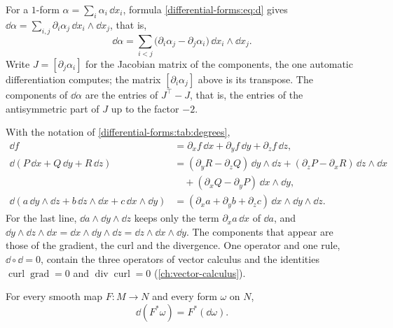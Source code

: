 \begin{notechapter}
For a $1$-form $\alpha = \sum_i\alpha_i\,\dd x_i$, formula
\eqref{differential-forms:eq:d} gives
$\dd\alpha = \sum_{i,j}\partial_i\alpha_j\,\dd x_i\wedge\dd x_j$, that is,
\begin{equation}\label{differential-forms:eq:one-form}
  \dd\alpha = \sum_{i<j}\bigl(\partial_i\alpha_j - \partial_j\alpha_i
  \bigr)\,\dd x_i\wedge\dd x_j .
\end{equation}
Write $J = [\partial_j\alpha_i]$ for the Jacobian matrix of the
components, the one automatic differentiation computes; the matrix
$[\partial_i\alpha_j]$ above is its transpose. The components of
$\dd\alpha$ are the entries of $J^\top - J$, that is, the entries of
the antisymmetric part of $J$ up to the factor $-2$.

\begin{example}[Forms on $\R^3$]\label{differential-forms:ex:r3}
With the notation of \cref{differential-forms:tab:degrees},
\begin{align*}
  \dd f &= \partial_xf\,\dd x + \partial_yf\,\dd y
          + \partial_zf\,\dd z , \\
  \dd(P\,\dd x + Q\,\dd y + R\,\dd z)
  &= (\partial_yR - \partial_zQ)\,\dd y\wedge\dd z
   + (\partial_zP - \partial_xR)\,\dd z\wedge\dd x \\
  &\quad + (\partial_xQ - \partial_yP)\,\dd x\wedge\dd y , \\
  \dd(a\,\dd y\wedge\dd z + b\,\dd z\wedge\dd x
      + c\,\dd x\wedge\dd y)
  &= (\partial_xa + \partial_yb + \partial_zc)\,
     \dd x\wedge\dd y\wedge\dd z .
\end{align*}
For the last line, $\dd a\wedge\dd y\wedge\dd z$ keeps only the term
$\partial_xa\,\dd x$ of $\dd a$, and
$\dd y\wedge\dd z\wedge\dd x = \dd x\wedge\dd y\wedge\dd z
= \dd z\wedge\dd x\wedge\dd y$. The components that appear are those of
the gradient, the curl and the divergence. One operator and one rule,
$\dd\circ\dd = 0$, contain the three operators of vector calculus and
the identities $\operatorname{curl}\operatorname{grad} = 0$ and
$\operatorname{div}\operatorname{curl} = 0$
(\cref{ch:vector-calculus}).
\end{example}

\begin{theorem}[Naturality]\label{differential-forms:thm:natural}
For every smooth map $F:M\to N$ and every form $\omega$ on $N$,
\[
  \dd(F^*\omega) = F^*(\dd\omega) .
\]
\end{theorem}


\end{notechapter}

